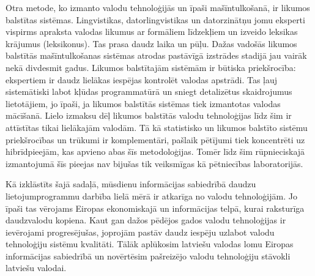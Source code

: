 \begin{multicols}{2}
Otra metode, ko izmanto valodu tehnoloģijās un īpaši mašīntulkošanā, ir likumos balstītas sistēmas. 
Lingvistikas, datorlingvistikas un datorzinātņu jomu eksperti vispirms apraksta valodas likumus ar formāliem līdzekļiem un izveido leksikas krājumus (leksikonus). 
Tas prasa daudz laika un pūļu.
Dažas vadošās likumos balstītās mašīntulkošanas sistēmas atrodas pastāvīgā izstrādes stadijā jau vairāk nekā divdesmit gadus. 
Likumos balstītajām sistēmām ir būtiska priekšrocība: ekspertiem ir daudz lielākas iespējas kontrolēt valodas apstrādi. 
Tas ļauj sistemātiski labot kļūdas programmatūrā un sniegt detalizētus skaidrojumus lietotājiem, jo īpaši, ja likumos balstītās sistēmas tiek izmantotas valodas mācīšanā.
Lielo izmaksu dēļ likumos balstītās valodu tehnoloģijas līdz šim ir attīstītas tikai lielākajām valodām. 
Tā kā statistisko un likumos balstīto sistēmu priekšrocības un trūkumi ir komplementāri, pašlaik pētījumi tiek koncentrēti uz hibrīdpieejām, kas apvieno abas šīs metodoloģijas. 
Tomēr līdz šim rūpnieciskajā izmantojumā šīs pieejas nav bijušas tik veiksmīgas kā pētniecības laboratorijās. 

Kā izklāstīts šajā sadaļā, mūsdienu informācijas sabiedrībā daudzu lietojumprogrammu darbība lielā mērā ir atkarīga no valodu tehnoloģijām. 
Jo īpaši tas vērojams Eiropas ekonomiskajā un informācijas telpā, kurai raksturīga daudzvalodu kopiena. 
Kaut gan dažos pēdējos gados valodu tehnoloģijas ir ievērojami progresējušas, joprojām pastāv daudz iespēju uzlabot valodu tehnoloģiju sistēmu kvalitāti. 
Tālāk aplūkosim latviešu valodas lomu Eiropas informācijas sabiedrībā un novērtēsim pašreizējo valodu tehnoloģiju stāvokli latviešu valodai. 
\end{multicols}

\clearpage



